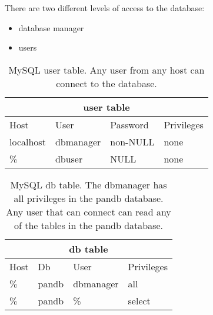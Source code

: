\begin{slide*}

\centerline{}

{\Large

There are two different levels of access to the database:

\begin{itemize}
\item{} database manager
\item{} users
\end{itemize}
}

\begin{table}[htbp]
\begin{center}
\begin{tabular}{|l|l|l|l|} \hline
\multicolumn{4}{|c|}{user table}\\ \hline
      Host                & User      & Password & Privileges \\ \hline\hline
      localhost           & dbmanager & non-NULL & none \\
      \%                  & dbuser      & NULL     & none \\ \hline
\end{tabular}
\caption{MySQL user table. Any user from any host can connect to the database.}
\label{usertable}
\end{center}
\end{table}

\begin{table}[htbp]
\begin{center}
\begin{tabular}{|l|l|l|l|} \hline
\multicolumn{4}{|c|}{db table}\\ \hline
      Host  & Db     &User      &Privileges\\ \hline\hline
       \%   &  pandb & dbmanager& all\\
       \%   &  pandb & \%       &  select\\ \hline
\end{tabular}
\caption{MySQL db table. The dbmanager has all privileges in the pandb
database. Any user that can connect can read any of the tables in the
pandb database.}
\label{dbtable}
\end{center}
\end{table}


\end{slide*}

